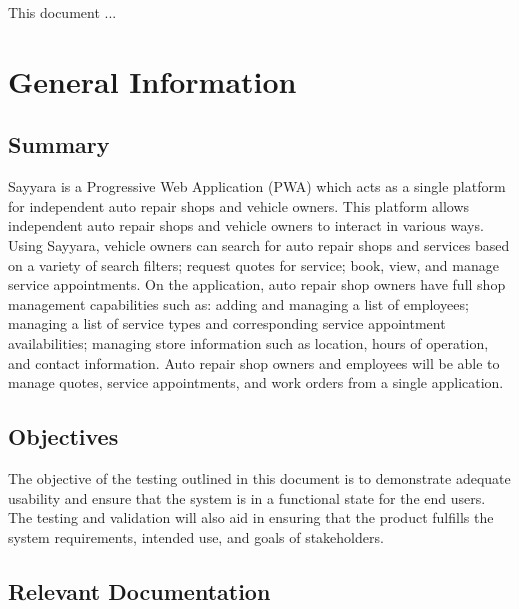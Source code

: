 \documentclass[12pt, titlepage]{article}
\begin{document}
\newpage


This document ... 

\section{General Information}

\subsection{Summary}

Sayyara is a Progressive Web Application (PWA) which acts as a single platform for independent auto
repair shops and vehicle owners. This platform allows independent auto repair shops and vehicle
owners to interact in various ways. Using Sayyara, vehicle owners can search for auto repair shops
and services based on a variety of search filters; request quotes for service; book, view, and
manage service appointments. On the application, auto repair shop owners have full shop management
capabilities such as: adding and managing a list of employees; managing a list of service types and
corresponding service appointment availabilities; managing store information such as location,
hours of operation, and contact information. Auto repair shop owners and employees will be able to
manage quotes, service appointments, and work orders from a single application.

\subsection{Objectives}

The objective of the testing outlined in this document is to demonstrate adequate usability and
ensure that the system is in a functional state for the end users. The testing and validation will
also aid in ensuring that the product fulfills the system requirements, intended use, and goals of
stakeholders.

\subsection{Relevant Documentation}

\end{document}
